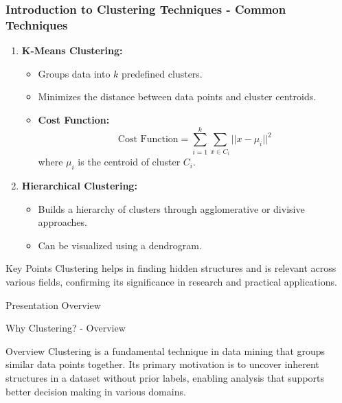 \documentclass[aspectratio=169]{beamer}
\begin{document}
\begin{frame}[fragile]
    \frametitle{Introduction to Clustering Techniques - Common Techniques}
    \begin{enumerate}
        \item \textbf{K-Means Clustering:}
        \begin{itemize}
            \item Groups data into \( k \) predefined clusters.
            \item Minimizes the distance between data points and cluster centroids.
            \item \textbf{Cost Function:}
            \begin{equation}
                \text{Cost Function} = \sum_{i=1}^{k} \sum_{x \in C_i} || x - \mu_i ||^2
            \end{equation}
            where \( \mu_i \) is the centroid of cluster \( C_i \).
        \end{itemize}
        
        \item \textbf{Hierarchical Clustering:}
        \begin{itemize}
            \item Builds a hierarchy of clusters through agglomerative or divisive approaches.
            \item Can be visualized using a dendrogram.
        \end{itemize}
    \end{enumerate}
    
    \begin{block}{Key Points}
        Clustering helps in finding hidden structures and is relevant across various fields, confirming its significance in research and practical applications.
    \end{block}
\end{frame}

\begin{frame}[fragile]{Presentation Overview}
  \tableofcontents[hideallsubsections]
\end{frame}

\begin{frame}[fragile]{Why Clustering? - Overview}
  \begin{block}{Overview}
    Clustering is a fundamental technique in data mining that groups similar data points together. Its primary motivation is to uncover inherent structures in a dataset without prior labels, enabling analysis that supports better decision making in various domains.
  \end{block}
\end{frame}
\end{document}
